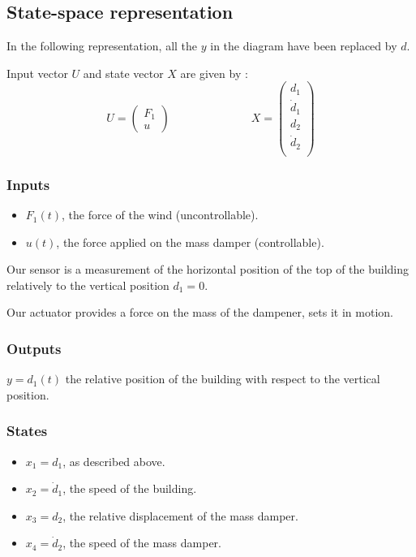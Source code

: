 \subsection{State-space representation}
In the following representation, all the $y$ in the diagram have been replaced by $d$.\par
Input vector $U$ and state vector $X$ are given by :
$$
U = \begin{pmatrix}
    F_1 \\
    u
\end{pmatrix}
\hspace{3cm}
X = \begin{pmatrix}
    d_1 \\
    \dot d_1 \\
    d_2 \\ 
    \dot d_2 \\
\end{pmatrix}
$$

\subsubsection{Inputs}
\begin{itemize}
    \item $F_1(t)$, the force of the wind (uncontrollable).
    \item $u(t)$, the force applied on the mass damper (controllable).
\end{itemize}
Our sensor is a measurement of the horizontal position of the top of the building relatively to the vertical position $d_1 = 0$.\par
Our actuator provides a force on the mass of the dampener, sets it in motion.

\subsubsection{Outputs}
$y = d_1(t)$ the relative position of the building with respect to the vertical position.

\subsubsection{States}
\begin{itemize}
    \item $x_1 = d_1$, as described above.
    \item $x_2 = \dot d_1$, the speed of the building.
    \item $x_3 = d_2$, the relative displacement of the mass damper.
    \item $x_4 = \dot d_2$, the speed of the mass damper.
\end{itemize}

